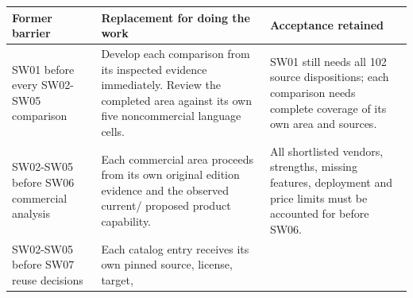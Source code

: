 \documentclass[
  10pt,
]{article}
\begin{document}
\begin{longtable}[]{@{}>{\raggedright\arraybackslash}p{}>{\raggedright\arraybackslash}p{}>{\raggedright\arraybackslash}p{}@{}}
\toprule
\begin{minipage}[b]{\linewidth}\raggedright
Former barrier\strut
\end{minipage} & \begin{minipage}[b]{\linewidth}\raggedright
Replacement for doing the work\strut
\end{minipage} & \begin{minipage}[b]{\linewidth}\raggedright
Acceptance retained\strut
\end{minipage}\tabularnewline
\midrule
\endhead
\begin{minipage}[t]{\linewidth}\raggedright
SW01 before every SW02-SW05 comparison\strut
\end{minipage} & \begin{minipage}[t]{\linewidth}\raggedright
Develop each comparison from its inspected evidence immediately. Review
the completed area against its own five noncommercial language
cells.\strut
\end{minipage} & \begin{minipage}[t]{\linewidth}\raggedright
SW01 still needs all 102 source dispositions; each comparison needs
complete coverage of its own area and sources.\strut
\end{minipage}\tabularnewline
\begin{minipage}[t]{\linewidth}\raggedright
SW02-SW05 before SW06 commercial analysis\strut
\end{minipage} & \begin{minipage}[t]{\linewidth}\raggedright
Each commercial area proceeds from its own original edition evidence and
the observed current/ proposed product capability.\strut
\end{minipage} & \begin{minipage}[t]{\linewidth}\raggedright
All shortlisted vendors, strengths, missing features, deployment and
price limits must be accounted for before SW06.\strut
\end{minipage}\tabularnewline
\begin{minipage}[t]{\linewidth}\raggedright
SW02-SW05 before SW07 reuse decisions\strut
\end{minipage} & \begin{minipage}[t]{\linewidth}\raggedright
Each catalog entry receives its own pinned source, license, target,

\end{minipage}
\end{longtable}
\end{document}

